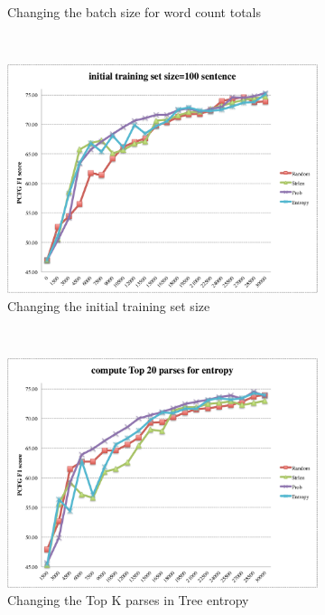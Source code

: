 \documentclass[winfonts,UTF8]{article}
\begin{document}
\begin{enumerate}
\begin{figure}[!htbp]
\begin{subfigure}[b]{0.45\textwidth}
\caption{Changing the batch size for word count totals}
\label{fig:res_ext1}
\end{subfigure}
~
\begin{subfigure}[b]{0.45\textwidth}
\includegraphics[width=\textwidth]{res3.pdf}
\caption{Changing the initial training set size}
\label{fig:res_ext2}
\end{subfigure}
~
\begin{subfigure}[b]{0.45\textwidth}
\includegraphics[width=\textwidth]{res4.pdf}
\caption{Changing the Top K parses in Tree entropy}
\label{fig:res_ext3}
\end{subfigure}
~~~~~~~~~~~~
\begin{subfigure}[b]{0.45\textwidth}

\end{subfigure}
\end{figure}
\end{enumerate}
\end{document}
